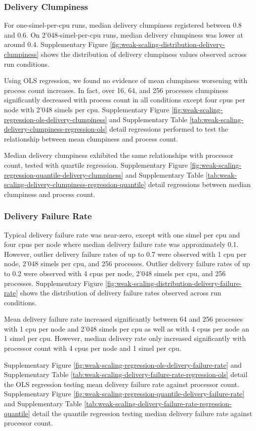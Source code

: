 \subsubsection{Delivery Clumpiness}

For one-simel-per-cpu runs, median delivery clumpiness registered between 0.8 and 0.6.
On 2'048-simel-per-cpu runs, median delivery clumpiness was lower at around 0.4.
Supplementary Figure \ref{fig:weak-scaling-distribution-delivery-clumpiness}
shows the distribution of delivery clumpiness values observed across run conditions.

Using OLS regression, we found no evidence of mean clumpiness worsening with process count increases.
In fact, over 16, 64, and 256 processes clumpiness significantly decreased with process count in all conditions except four cpus per node with 2'048 simels per cpu.
Supplementary Figure \ref{fig:weak-scaling-regression-ols-delivery-clumpiness} and Supplementary Table \ref{tab:weak-scaling-delivery-clumpiness-regression-ols} detail regressions performed to test the relationship between mean clumpiness and process count.

Median delivery clumpiness exhibited the same relationships with processor count, tested with quartile regression.
Supplementary Figure \ref{fig:weak-scaling-regression-quantile-delivery-clumpiness} and Supplementary Table \ref{tab:weak-scaling-delivery-clumpiness-regression-quantile} detail regressions between median clumpiness and process count.

\subsubsection{Delivery Failure Rate}

Typical delivery failure rate was near-zero, except with one simel per cpu and four cpus per node where median delivery failure rate was approximately 0.1.
However, outlier delivery failure rates of up to 0.7 were observed with 1 cpu per node, 2'048 simels per cpu, and 256 processes.
Outlier delivery failure rates of up to 0.2 were observed with 4 cpus per node, 2'048 simels per cpu, and 256 processes.
Supplementary Figure \ref{fig:weak-scaling-distribution-delivery-failure-rate} shows the distribution of delivery failure rates observed across run conditions.

Mean delivery failure rate increased significantly between 64 and 256 processes with 1 cpu per node and 2'048 simels per cpu as well as with 4 cpus per node an 1 simel per cpu.
However, median delivery rate only increased significantly with processor count with 4 cpus per node and 1 simel per cpu.

Supplementary Figure \ref{fig:weak-scaling-regression-ols-delivery-failure-rate} and Supplementary Table \ref{tab:weak-scaling-delivery-failure-rate-regression-ols} detail the OLS regression testing mean delivery failure rate against processor count.
Supplementary Figure \ref{fig:weak-scaling-regression-quantile-delivery-failure-rate} and Supplementary Table \ref{tab:weak-scaling-delivery-failure-rate-regression-quantile} detail the quantile regression testing median delivery failure rate against processor count.
